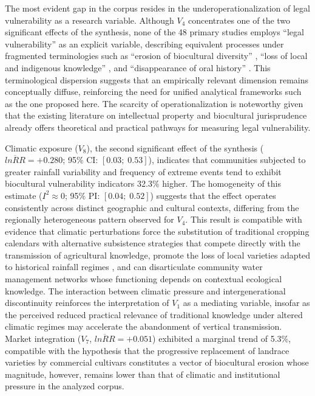 \documentclass[12pt,a4paper]{article}
\begin{document}
The most evident gap in the corpus resides in the underoperationalization of legal vulnerability as a research variable. Although $V_4$ concentrates one of the two significant effects of the synthesis, none of the 48 primary studies employs ``legal vulnerability'' as an explicit variable, describing equivalent processes under fragmented terminologies such as ``erosion of biocultural diversity'' \citep{Mobarak2025}, ``loss of local and indigenous knowledge'' \citep{Suwardi2025}, and ``disappearance of oral history'' \citep{LaRosa2021}. This terminological dispersion suggests that an empirically relevant dimension remains conceptually diffuse, reinforcing the need for unified analytical frameworks such as the one proposed here. The scarcity of operationalization is noteworthy given that the existing literature on intellectual property \citep{Dutfield2004} and biocultural jurisprudence \citep{BavikatteRobinson2011,Nemoga2022} already offers theoretical and practical pathways for measuring legal vulnerability.

Climatic exposure ($V_8$), the second significant effect of the synthesis ($\overline{lnRR} = +0.280$; 95\% CI: $[0.03;\; 0.53]$), indicates that communities subjected to greater rainfall variability and frequency of extreme events tend to exhibit biocultural vulnerability indicators 32.3\% higher. The homogeneity of this estimate ($I^2 \approx 0$; 95\% PI: $[0.04;\; 0.52]$) suggests that the effect operates consistently across distinct geographic and cultural contexts, differing from the regionally heterogeneous pattern observed for $V_4$. This result is compatible with evidence that climatic perturbations force the substitution of traditional cropping calendars with alternative subsistence strategies that compete directly with the transmission of agricultural knowledge, promote the loss of local varieties adapted to historical rainfall regimes \citep{Savo2016}, and can disarticulate community water management networks whose functioning depends on contextual ecological knowledge. The interaction between climatic pressure and intergenerational discontinuity reinforces the interpretation of $V_1$ as a mediating variable, insofar as the perceived reduced practical relevance of traditional knowledge under altered climatic regimes may accelerate the abandonment of vertical transmission. Market integration ($V_7$, $\overline{lnRR} = +0.051$) exhibited a marginal trend of 5.3\%, compatible with the hypothesis that the progressive replacement of landrace varieties by commercial cultivars constitutes a vector of biocultural erosion whose magnitude, however, remains lower than that of climatic and institutional pressure in the analyzed corpus.
\end{document}
